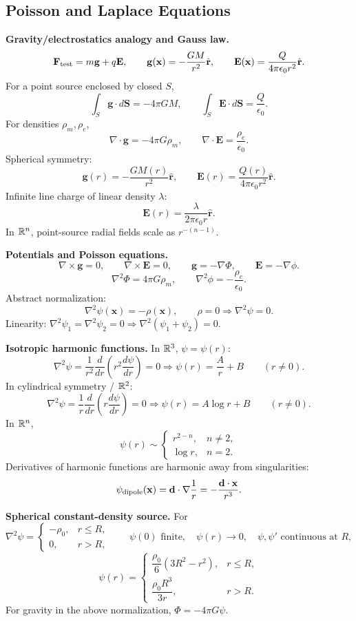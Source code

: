 \subsection{Poisson and Laplace Equations}

\noindent\textbf{Gravity/electrostatics analogy and Gauss law.}
\[
\mathbf{F}_{\rm test}=m\mathbf{g}+q\mathbf{E},\qquad
\mathbf{g}(\mathbf{x})=-\frac{GM}{r^2}\hat{\mathbf{r}},\qquad
\mathbf{E}(\mathbf{x})=\frac{Q}{4\pi\epsilon_0r^2}\hat{\mathbf{r}}.
\]
For a point source enclosed by closed $S$,
\[
\boxed{\int_S\mathbf{g}\cdot d\mathbf{S}=-4\pi GM},
\qquad
\boxed{\int_S\mathbf{E}\cdot d\mathbf{S}=\frac{Q}{\epsilon_0}}.
\]
For densities $\rho_m,\rho_e$,
\[
\boxed{\nabla\cdot\mathbf{g}=-4\pi G\rho_m},
\qquad
\boxed{\nabla\cdot\mathbf{E}=\frac{\rho_e}{\epsilon_0}}.
\]
Spherical symmetry:
\[
\mathbf{g}(r)=-\frac{GM(r)}{r^2}\hat{\mathbf{r}},\qquad
\mathbf{E}(r)=\frac{Q(r)}{4\pi\epsilon_0r^2}\hat{\mathbf{r}}.
\]
Infinite line charge of linear density $\lambda$:
\[
\boxed{\mathbf{E}(r)=\frac{\lambda}{2\pi\epsilon_0r}\hat{\mathbf{r}}.}
\]
In $\mathbb{R}^n$, point-source radial fields scale as $r^{-(n-1)}$.

\noindent\textbf{Potentials and Poisson equations.}
\[
\nabla\times\mathbf{g}=0,\qquad \nabla\times\mathbf{E}=0,\qquad
\mathbf{g}=-\nabla\Phi,\qquad \mathbf{E}=-\nabla\phi.
\]
\[
\boxed{\nabla^2\Phi=4\pi G\rho_m},\qquad
\boxed{\nabla^2\phi=-\frac{\rho_e}{\epsilon_0}}.
\]
Abstract normalization:
\[
\boxed{\nabla^2\psi(\mathbf{x})=-\rho(\mathbf{x})},\qquad
\rho=0\Rightarrow \boxed{\nabla^2\psi=0}.
\]
Linearity: $\nabla^2\psi_1=\nabla^2\psi_2=0\Rightarrow
\nabla^2(\psi_1+\psi_2)=0$.

\noindent\textbf{Isotropic harmonic functions.}
In $\mathbb{R}^3$, $\psi=\psi(r)$:
\[
\nabla^2\psi=\frac{1}{r^2}\frac{d}{dr}
\left(r^2\frac{d\psi}{dr}\right)=0
\Rightarrow
\boxed{\psi(r)=\frac{A}{r}+B}\qquad(r\ne0).
\]
In cylindrical symmetry / $\mathbb{R}^2$:
\[
\nabla^2\psi=\frac{1}{r}\frac{d}{dr}
\left(r\frac{d\psi}{dr}\right)=0
\Rightarrow
\boxed{\psi(r)=A\log r+B}\qquad(r\ne0).
\]
In $\mathbb{R}^n$,
\[
\psi(r)\sim
\begin{cases}
r^{2-n}, & n\ne2,\\
\log r, & n=2.
\end{cases}
\]
Derivatives of harmonic functions are harmonic away from singularities:
\[
\psi_{\rm dipole}(\mathbf{x})
=\mathbf{d}\cdot\nabla\frac{1}{r}
=-\frac{\mathbf{d}\cdot\mathbf{x}}{r^3}.
\]

\noindent\textbf{Spherical constant-density source.}
For
\[
\nabla^2\psi=
\begin{cases}
-\rho_0, & r\le R,\\
0, & r>R,
\end{cases}
\qquad
\psi(0)\text{ finite},\quad \psi(r)\to0,\quad
\psi,\psi'\text{ continuous at }R,
\]
\[
\boxed{
\psi(r)=
\begin{cases}
\dfrac{\rho_0}{6}(3R^2-r^2), & r\le R,\\[4pt]
\dfrac{\rho_0R^3}{3r}, & r>R.
\end{cases}}
\]
For gravity in the above normalization, $\Phi=-4\pi G\psi$.

